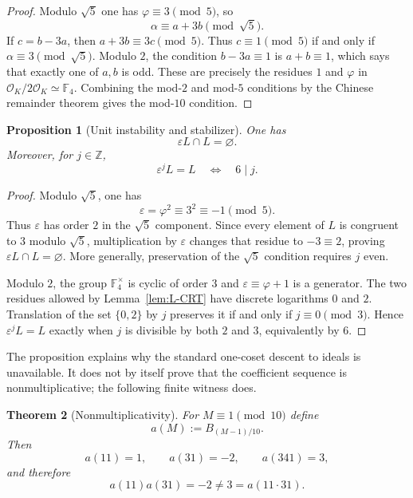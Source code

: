 \documentclass[12pt]{amsart}
\newtheorem{theorem}{Theorem}[section]
\newtheorem{proposition}[theorem]{Proposition}
\theoremstyle{definition}
\theoremstyle{remark}
\newcommand{\ZZ}{\mathbb{Z}}
\newcommand{\FF}{\mathbb{F}}
\newcommand{\OK}{\mathcal{O}_K}
\newcommand{\eps}{\varepsilon}
\newcommand{\ph}{\varphi}
\begin{document}
\begin{proof}
Modulo $\sqrt5$ one has $\ph\equiv3\pmod5$, so
\[
  \alpha\equiv a+3b\pmod{\sqrt5}.
\]
If $c=b-3a$, then $a+3b\equiv3c\pmod5$.  Thus
$c\equiv1\pmod5$ if and only if
$\alpha\equiv3\pmod{\sqrt5}$.  Modulo $2$, the condition
$b-3a\equiv1$ is $a+b\equiv1$, which says that exactly one of $a,b$
is odd.  These are precisely the residues $1$ and $\ph$ in
$\OK/2\OK\simeq\FF_4$.  Combining the mod-$2$ and mod-$5$ conditions
by the Chinese remainder theorem gives the mod-$10$ condition.
\end{proof}

\begin{proposition}[Unit instability and stabilizer]\label{prop:unit}
One has
\[
  \eps L\cap L=\varnothing.
\]
Moreover, for $j\in\ZZ$,
\[
  \eps^jL=L\quad\Longleftrightarrow\quad6\mid j.
\]
\end{proposition}

\begin{proof}
Modulo $\sqrt5$, one has
\[
  \eps=\ph^2\equiv3^2\equiv-1\pmod5.
\]
Thus $\eps$ has order $2$ in the $\sqrt5$ component.  Since every
element of $L$ is congruent to $3$ modulo $\sqrt5$, multiplication by
$\eps$ changes that residue to $-3\equiv2$, proving
$\eps L\cap L=\varnothing$.  More generally, preservation of the
$\sqrt5$ condition requires $j$ even.

Modulo $2$, the group $\FF_4^\times$ is cyclic of order $3$ and
$\eps\equiv\ph+1$ is a generator.  The two residues allowed by
Lemma~\ref{lem:L-CRT} have discrete logarithms $0$ and $2$.  Translation
of the set $\{0,2\}$ by $j$ preserves it if and only if
$j\equiv0\pmod3$.  Hence $\eps^jL=L$ exactly when $j$ is divisible by
both $2$ and $3$, equivalently by $6$.
\end{proof}

The proposition explains why the standard one-coset descent to ideals
is unavailable.  It does not by itself prove that the coefficient
sequence is nonmultiplicative; the following finite witness does.

\begin{theorem}[Nonmultiplicativity]\label{thm:nonmult}
For $M\equiv1\pmod{10}$ define
\[
  a(M):=B_{(M-1)/10}.
\]
Then
\[
  a(11)=1,
  \qquad
  a(31)=-2,
  \qquad
  a(341)=3,
\]
and therefore
\[
  a(11)a(31)=-2\neq3=a(11\cdot31).
\]
\end{theorem}
\end{document}
